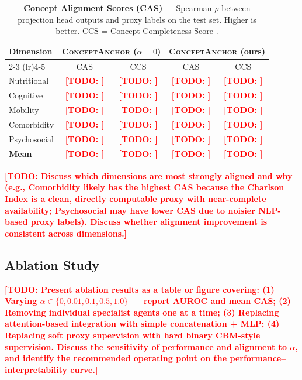\documentclass[review,12pt,authoryear]{elsarticle}
\newcommand{\todo}[1]{\textcolor{red}{\textbf{[TODO: #1]}}}
\newcommand{\modelname}{\textsc{ConceptAnchor}}
\begin{document}
\begin{table}[t]
  \centering
  \caption{\textbf{Concept Alignment Scores (CAS)} — Spearman $\rho$ between projection head outputs and proxy labels on the test set.
  Higher is better. CCS = Concept Completeness Score \citep{yeh2020completeness}.}
  \label{tab:alignment_results}
  \begin{tabular}{lcccc}
    \toprule
    \multirow{2}{*}{\textbf{Dimension}} & \multicolumn{2}{c}{\textbf{\modelname{} ($\alpha=0$)}} & \multicolumn{2}{c}{\textbf{\modelname{} (ours)}} \\
    \cmidrule(lr){2-3} \cmidrule(lr){4-5}
    & CAS & CCS & CAS & CCS \\
    \midrule
    Nutritional   & \todo{} & \todo{} & \todo{} & \todo{} \\
    Cognitive     & \todo{} & \todo{} & \todo{} & \todo{} \\
    Mobility      & \todo{} & \todo{} & \todo{} & \todo{} \\
    Comorbidity   & \todo{} & \todo{} & \todo{} & \todo{} \\
    Psychosocial  & \todo{} & \todo{} & \todo{} & \todo{} \\
    \midrule
    \textbf{Mean} & \todo{} & \todo{} & \todo{} & \todo{} \\
    \bottomrule
  \end{tabular}
\end{table}

\todo{Discuss which dimensions are most strongly aligned and why (e.g., Comorbidity likely has the highest CAS because the Charlson Index is a clean, directly computable proxy with near-complete availability; Psychosocial may have lower CAS due to noisier NLP-based proxy labels). Discuss whether alignment improvement is consistent across dimensions.}

\subsection{Ablation Study}

\todo{Present ablation results as a table or figure covering: (1) Varying $\alpha \in \{0, 0.01, 0.1, 0.5, 1.0\}$ — report AUROC and mean CAS; (2) Removing individual specialist agents one at a time; (3) Replacing attention-based integration with simple concatenation + MLP; (4) Replacing soft proxy supervision with hard binary CBM-style supervision. Discuss the sensitivity of performance and alignment to $\alpha$, and identify the recommended operating point on the performance–interpretability curve.}
\end{document}
